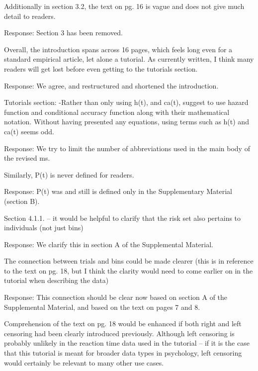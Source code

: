 \documentclass[
]{article}
\renewenvironment{quote}{\begin{leftbar}}{\end{leftbar}}
\begin{document}
\begin{quote}
Additionally in section 3.2, the text on pg. 16 is vague and does not
give much detail to readers.
\end{quote}

Response: Section 3 has been removed.

\begin{quote}
Overall, the introduction spans across 16 pages, which feels long even
for a standard empirical article, let alone a tutorial. As currently
written, I think many readers will get lost before even getting to the
tutorials section.
\end{quote}

Response: We agree, and restructured and shortened the introduction.

\begin{quote}
Tutorials section: -Rather than only using h(t), and ca(t), suggest to
use hazard function and conditional accuracy function along with their
mathematical notation. Without having presented any equations, using
terms such as h(t) and ca(t) seems odd.
\end{quote}

Response: We try to limit the number of abbreviations used in the main
body of the revised ms.

\begin{quote}
Similarly, P(t) is never defined for readers.
\end{quote}

Response: P(t) was and still is defined only in the Supplementary
Material (section B).

\begin{quote}
Section 4.1.1. -- it would be helpful to clarify that the risk set also
pertains to individuals (not just bins)
\end{quote}

Response: We clarify this in section A of the Supplemental Material.

\begin{quote}
The connection between trials and bins could be made clearer (this is in
reference to the text on pg. 18, but I think the clarity would need to
come earlier on in the tutorial when describing the data)
\end{quote}

Response: This connection should be clear now based on section A of the
Supplemental Material, and based on the text on pages 7 and 8.

\begin{quote}
Comprehension of the text on pg. 18 would be enhanced if both right and
left censoring had been clearly introduced previously. Although left
censoring is probably unlikely in the reaction time data used in the
tutorial -- if it is the case that this tutorial is meant for broader
data types in psychology, left censoring would certainly be relevant to
many other use cases.
\end{quote}
\end{document}
